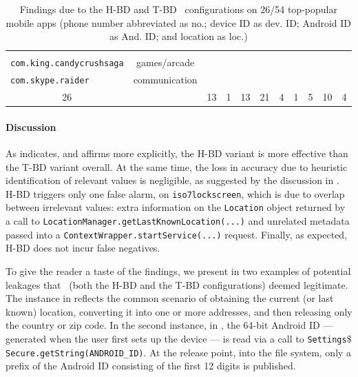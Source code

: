 \begin{table}
\begin{small}
\begin{center}
\begin{tabular}{l|c|c|c|c|c|c|c|c|c|c}
		     	             &     	&  		 \checkmark			& &
			              & &  \checkmark   & \\
	{\tt com.king.candycrushsaga}					& games/arcade 		& 		      		&
	   &     	&  		 \checkmark			& & & &    & \\
	{\tt com.skype.raider} 						& communication 			& 		      		&
	   &     	&  		 \checkmark			& &
	   & 		&    		\checkmark			& \\
	\hline \hline
	\multicolumn{1}{c|}{26} & & 13 & 1 & 13 & 21 & 4 & 1 & 5 & 10 & 4 \\
	\end{tabular}
	\end{center}
	\caption{\label{Ta:realworld}Findings due to the H-BD and T-BD \Tool\ configurations on 26/54 top-popular mobile apps (phone number abbreviated as no.; device 
	ID as dev. ID; Android ID as And. ID;  and location as loc.)}
\end{small}
\end{table} 

\paragraph{Discussion} As  indicates, and  affirms more explicitly, the H-BD variant is more effective than the T-BD variant overall. 
At the same time, the loss in accuracy due to heuristic identification of relevant values is negligible, as suggested by the discussion in . H-BD triggers only one false alarm, on {\tt iso7lockscreen},
which is due to overlap between irrelevant values: extra information on the {\tt Location} object returned by a call to {\tt LocationManager.getLastKnownLocation(...)} and unrelated metadata passed into a {\tt ContextWrapper.startService(...)} request.  Finally, as expected, H-BD does not incur false negatives.

To give the reader a taste of the findings, we present in  two examples of potential leakages that \Tool\ (both the H-BD and the T-BD configurations) deemed legitimate. The instance in  reflects the common scenario of obtaining the current (or last known) location, converting it into one or more addresses, and then releasing only the country or zip code. In the second instance, in , the 64-bit Android ID --- generated when the user first sets up the device --- is read via a call to \texttt{Settings$\$$Secure.getString(ANDROID\_ID)}. At the release point, into the file system, only a prefix of the Android ID consisting of the first 12 digits is published.   


